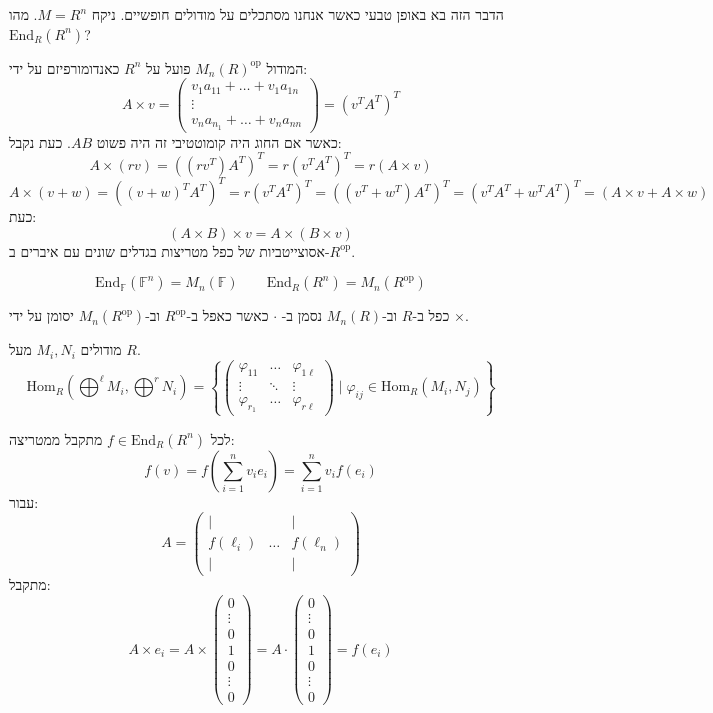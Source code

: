 \documentclass{tstextbook}
\begin{document}
הדבר הזה בא באופן טבעי כאשר אנחנו מסתכלים על מודולים חופשיים.
ניקח \(M=R^{n}\). מהו \(\mathrm{End}_{R}(R^{n})\)? 

המודול \(M_{n}(R)^{\text{op}}\) פועל על \(R^{n}\) כאנדומורפיזם על ידי:
$$A\times v = \begin{pmatrix}v_{1}a_{11}+\dots+v_{1}a_{1n} \\\vdots \\v_{n}a_{n_{1}}+\dots+v_{n}a_{nn}
\end{pmatrix}=(v^{T}A^{T})^{T}$$
כאשר אם החוג היה קומוטטיבי זה היה פשוט \(AB\). כעת נקבל:
$$A\times(rv)=((rv^{T})A^{T})^{T}=r(v^{T}A^{T})^{T}=r(A\times v)$$$$A\times(v+w)=((v+w)^{T}A^{T})^{T}=r(v^{T}A^{T})^{T}=((v^{T}+w^{T})A^{T})^{T}=(v^{T}A^{T}+w^{T}A^{T})^{T}=(A\times v+A\times w)$$
כעת:
$$(A\times B)\times v=A\times(B\times v)$$
אסוצייטביות של כפל מטריצות בגדלים שונים עם איברים ב-\(R^{\text{op}}\).

$$\mathrm{End}_{\mathbb{F}}(\mathbb{F} ^{n})=M_{n}(\mathbb{F} )\qquad \mathrm{End}_{R}(R^{n})=M_{n}(R^{\text{op}})$$

\begin{symbolize}
כפל ב-\(R\) וב-\(M_{n}(R)\) נסמן ב- \(\cdot\) כאשר כאפל ב-\(R^{\text{op}}\) וב-\(M_{n}(R^{\text{op}})\) יסומן על ידי \(\times\).

\end{symbolize}
מודולים \(M_{i},N_{i}\) מעל \(R\).
$$\mathrm{Hom}_{R}(\bigoplus^{\ell}M_{i},\bigoplus ^{r}N_{i})=\left\{ \begin{pmatrix}\varphi_{11} & \dots & \varphi_{1\ell} \\\vdots  & \ddots & \vdots\\\varphi_{r_{1}} & \dots & \varphi_{r\ell}
\end{pmatrix} \mid  \varphi_{ij}\in \mathrm{Hom}_{{R}}(M_{i},N_{j})\right\}$$

לכל \(f \in \mathrm{End}_{R}(R^{n})\) מתקבל ממטריצה:
$$f(v)=f\left( \sum_{i=1}^{n} v_{i}e_{i} \right)=\sum_{i=1}^{n} v_{i}f(e_{i})$$
עבור:
$$A=\begin{pmatrix}| &  & | \\f(\ell_{i}) & \dots  & f(\ell_{n}) \\| &  & |
\end{pmatrix}$$
מתקבל:
$$A\times e_{i}=A\times \begin{pmatrix}0\\ \vdots \\ 0 \\1 \\0\\ \vdots\\0\end{pmatrix}=A\cdot \begin{pmatrix}0\\ \vdots \\ 0 \\1 \\0\\ \vdots\\0
\end{pmatrix}=f(e_{i})$$
\end{document}
